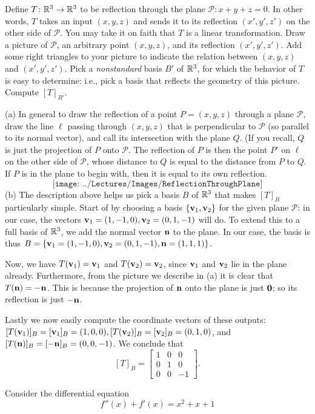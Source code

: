 \bb
\ii Define $T\colon {\mathbb R}^3\rightarrow {\mathbb R}^3$ to be reflection through the plane $\mathcal{P}\colon x+y+z=0$. In other words, $T$ takes an input $(x,y,z)$ and sends it to its reflection $(x',y',z')$ on the other side of $\mathcal{P}$. You may take it on faith that $T$ is a linear transformation. 
\bb
\ii Draw a picture of $\mathcal{P}$, an arbitrary point $(x,y,z)$, and its reflection $(x',y',z')$. Add some right triangles to your picture to indicate the relation between $(x,y,z)$ and $(x',y',z')$. 
\ii Pick a {\em nonstandard} basis $B'$ of ${\mathbb R}^3$, for which the behavior of $T$ is easy to determine: i.e., pick a basis that reflects the geometry of this picture. Compute $[T]_{B'}$. 
\ee 
\begin{solution}
\noindent
(a) In general to draw the reflection of a point $P=(x,y,z)$ through a plane $\mathcal{P}$, draw the line $\ell$ passing through $(x,y,z)$ that is perpendicular to $\mathcal{P}$ (so parallel to its normal vector), and call its intersection with the plane $Q$. (If you recall, $Q$ is just the projection of $P$ onto $\mathcal{P}$. The reflection of $P$ is then the point $P'$ on $\ell$ on the other side of $\mathcal{P}$, whose distance to $Q$ is equal to the distance from $P$ to $Q$. If $P$ is in the plane to begin with, then it is equal to its own reflection. 
\[
\texttt{[image: ../Lectures/Images/ReflectionThroughPlane]}
\]
(b) The description above helps us pick a basis $B$ of ${\mathbb R}^3$ that makes $[T]_B$ particularly simple. Start of by choosing a basis $\{{\mathbf v}_1, {\mathbf v}_2\}$ for the given plane $\mathcal{P}$: in our case, the vectors ${\mathbf v}_1=(1,-1,0), {\mathbf v}_2=(0,1,-1)$ will do. To extend this to a full basis of ${\mathbb R}^3$, we add the normal vector ${\mathbf n}$ to the plane. In our case, the basis is thus $B=\{{\mathbf v}_1=(1,-1,0), {\mathbf v}_2=(0,1,-1), {\mathbf n}=(1,1,1)\}$. 

Now, we have $T({\mathbf v}_1)={\mathbf v}_1$ and $T({\mathbf v}_2)={\mathbf v}_2$, since ${\mathbf v}_1$ and ${\mathbf v}_2$ lie in the plane already. Furthermore, from the picture we describe in (a) it is clear that $T({\mathbf n})=-{\mathbf n}$. This is because the projection of ${\mathbf n}$ onto the plane is just ${\mathbf 0}$; so its reflection is just $-{\mathbf n}$. 

Lastly we now easily compute the coordinate vectors of these outputs: $[T({\mathbf v}_1)]_B=[{\mathbf v}_1]_B=(1,0,0), [T({\mathbf v}_2)]_B=[{\mathbf v}_2]_B=(0,1,0)$, and $[T({\mathbf n})]_B=[-{\mathbf n}]_B=(0,0,-1)$. We conclude that 
\[
[T]_B=\begin{bmatrix}
1&0&0\\
0&1&0\\
0&0&-1
\end{bmatrix}.
\]

\end{solution}
\ii Consider the differential equation 
\[
f''(x)+f'(x)=x^2+x+1 \tag{$*$}
\]

